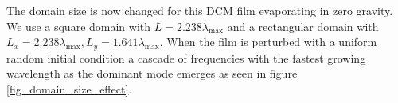 \documentclass[a4paper,12pt]{article}
\begin{document}








The domain size is now changed for this DCM film evaporating in zero gravity. We use a square domain with $L=2.238 \lambda_\text{max}$ and a rectangular domain with $L_x=2.238 \lambda_\text{max}, L_y=1.641\lambda_\text{max}$. When the film is perturbed with a uniform random initial condition a cascade of frequencies with the fastest growing wavelength as the dominant mode emerges as seen in figure \ref{fig_domain_size_effect}.
\end{document}
